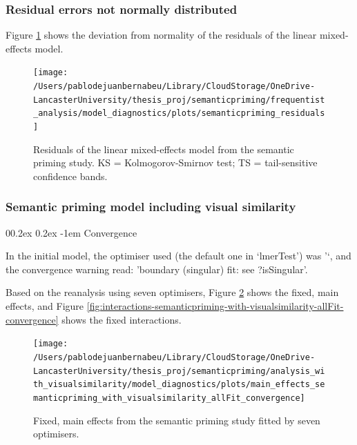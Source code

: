 \documentclass[
  12pt,
  man,floatsintext]{apa7}
\makeatletter
\let\oldparagraph\paragraph
\renewcommand{\paragraph}[1]{\oldparagraph{#1}\mbox{}}
\renewcommand{\paragraph}{\@startsection{paragraph}{4}{\parindent}%
  {0\baselineskip \@plus 0.2ex \@minus 0.2ex}%
  {-1em}%
  {\normalfont\normalsize\bfseries\itshape\typesectitle}}
\makeatother
\begin{document}
\hypertarget{residual-errors-not-normally-distributed-1}{%
\subsubsection{Residual errors not normally distributed}\label{residual-errors-not-normally-distributed-1}}

Figure \ref{fig:semanticpriming-residuals} shows the deviation from normality of the residuals of the linear mixed-effects model.

\begin{figure}

{\centering \texttt{[image: /Users/pablodejuanbernabeu/Library/CloudStorage/OneDrive-LancasterUniversity/thesis\_proj/semanticpriming/frequentist\_analysis/model\_diagnostics/plots/semanticpriming\_residuals]} 

}

\caption{Residuals of the linear mixed-effects model from the semantic priming study. \linebreak KS = Kolmogorov-Smirnov test; TS = tail-sensitive confidence bands.}\label{fig:semanticpriming-residuals}
\end{figure}

\hypertarget{semantic-priming-model-including-visual-similarity}{%
\subsubsection{Semantic priming model including visual similarity}\label{semantic-priming-model-including-visual-similarity}}

\hypertarget{convergence-3}{%
\paragraph{Convergence}\label{convergence-3}}

In the initial model, the optimiser used (the default one in `lmerTest') was '`, and the convergence warning read: 'boundary (singular) fit: see ?isSingular'.

Based on the reanalysis using seven optimisers, Figure \ref{fig:main-effects-semanticpriming-with-visualsimilarity-allFit-convergence} shows the fixed, main effects, and Figure \ref{fig:interactions-semanticpriming-with-visualsimilarity-allFit-convergence} shows the fixed interactions.

\begin{figure}

{\centering \texttt{[image: /Users/pablodejuanbernabeu/Library/CloudStorage/OneDrive-LancasterUniversity/thesis\_proj/semanticpriming/analysis\_with\_visualsimilarity/model\_diagnostics/plots/main\_effects\_semanticpriming\_with\_visualsimilarity\_allFit\_convergence]} 

}

\caption{Fixed, main effects from the semantic priming study fitted by seven optimisers.}\label{fig:main-effects-semanticpriming-with-visualsimilarity-allFit-convergence}
\end{figure}
\end{document}
